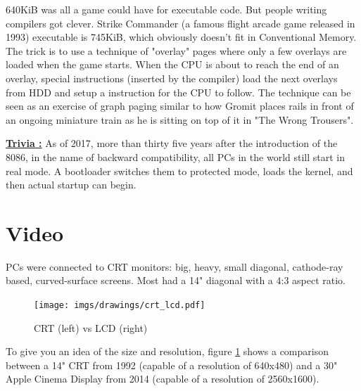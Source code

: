 \documentclass[book.tex]{subfiles}
\begin{document}
\par
{} 640KiB was all a game could have for executable code. But people writing compilers got clever. Strike Commander (a famous flight arcade game released in 1993) executable is 745KiB, which obviously doesn't fit in Conventional Memory. The trick is to use a technique of "overlay" pages where only a few overlays are loaded when the game starts. When the CPU is about to reach the end of an overlay, special instructions (inserted by the compiler) load the next overlays from HDD and setup a  instruction for the CPU to follow. The technique can be seen as an exercise of graph paging similar to how Gromit places rails in front of an ongoing miniature train as he is sitting on top of it in "The Wrong Trousers".\\
\par

\textbf{\underline{Trivia :}}  As of 2017, more than thirty five years after the introduction of the 8086, in the name of backward compatibility, all PCs in the world still start in real mode. A bootloader switches them to protected mode, loads the kernel, and then actual startup can begin.














\section{Video}

PCs were connected to CRT monitors: big, heavy, small diagonal, cathode-ray based, curved-surface screens. Most had a 14" diagonal with a 4:3 aspect ratio.\\
\par


\begin{figure}[H]
\centering
\texttt{[image: imgs/drawings/crt\_lcd.pdf]}
\caption{CRT (left) vs LCD (right)}
\label{fig:lcd_vs_crt}
\end{figure}
\par
  To give you an idea of the size and resolution, figure \ref{fig:lcd_vs_crt} shows a comparison between a 14" CRT from 1992 (capable of a resolution of 640x480) and a 30" Apple Cinema Display from 2014 (capable of a resolution of 2560x1600).\\
  \par
{}
\end{document}
